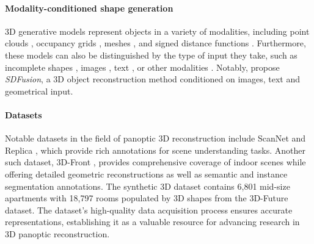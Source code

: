 \paragraph{Modality-conditioned shape generation}
3D generative models represent objects in a variety of modalities, including point clouds \citep{achlioptas2018learning, luo2021diffusion}, occupancy grids \citep{mescheder2019occupancy}, meshes \citep{mo2019structurenet}, and signed distance functions \citep{park2019deepsdf}.
Furthermore, these models can also be distinguished by the type of input they take, such as incomplete shapes \citep{dai2017shape}, images \citep{fan2017point}, text \citep{liu2022towards, zhao2023michelangelo}, or other modalities \citep{Zhou_2021_CVPR}. 
Notably, \citet{cheng2023sdfusion} propose \emph{SDFusion}, a 3D object reconstruction method conditioned on images, text and geometrical input.

\paragraph{Datasets}
Notable datasets in the field of panoptic 3D reconstruction include ScanNet \citep{dai2017scannet} and Replica \citep{straub2019replica}, which provide rich annotations for scene understanding tasks.
Another such dataset, 3D-Front \citep{fu20213d}, provides comprehensive coverage of indoor scenes while offering detailed geometric reconstructions as well as semantic and instance segmentation annotations.
The synthetic 3D dataset contains 6,801 mid-size apartments with 18,797 rooms populated by 3D shapes from the 3D-Future \citep{fu20213e} dataset. The dataset's high-quality data acquisition process ensures accurate representations, establishing it as a valuable resource for advancing research in 3D panoptic reconstruction. 

